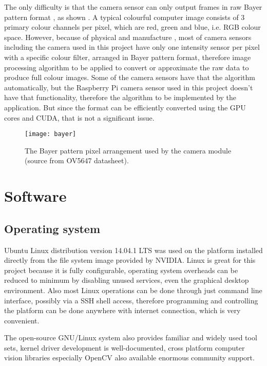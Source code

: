 The only difficulty is that the camera sensor can only output frames in raw Bayer pattern format \cite{bayer1976color}, as shown  . A typical colourful computer image consists of 3 primary colour channels per pixel, which are red, green and blue, i.e. RGB colour space. However, because of physical and manufacture , most of camera sensors including the camera used in this project have only one intensity sensor per pixel with a specific colour filter, arranged in Bayer pattern format, therefore image processing algorithm  to be applied to convert or approximate the raw data to produce full colour images. Some of the camera sensors have  that  the algorithm automatically, but the Raspberry Pi camera sensor used in this project doesn't have that functionality, therefore the algorithm  to be implemented by the application. But since the format can be efficiently converted using the GPU cores and CUDA, that is not a significant issue.

\begin{figure}[H]
  \centering
  \texttt{[image: bayer]}
  \caption{The Bayer pattern pixel arrangement used by the camera module (source from OV5647 datasheet).}
  \label{bayer}
\end{figure}

\section{Software}

\subsection{Operating system}

Ubuntu Linux distribution version 14.04.1 LTS was used on the platform  installed directly from the file system image provided by NVIDIA. Linux is great for this project because it is fully configurable, operating system overheads can be reduced to minimum by disabling unused services, even the graphical desktop environment. Also most Linux operations can be done through just command line interface, possibly via a SSH shell access, therefore programming and controlling the platform can be done anywhere with internet connection, which is very convenient.

The open-source GNU/Linux system also provides familiar and widely used tool sets, kernel driver development is well-documented, cross platform computer vision libraries especially OpenCV  also available  enormous community support.

